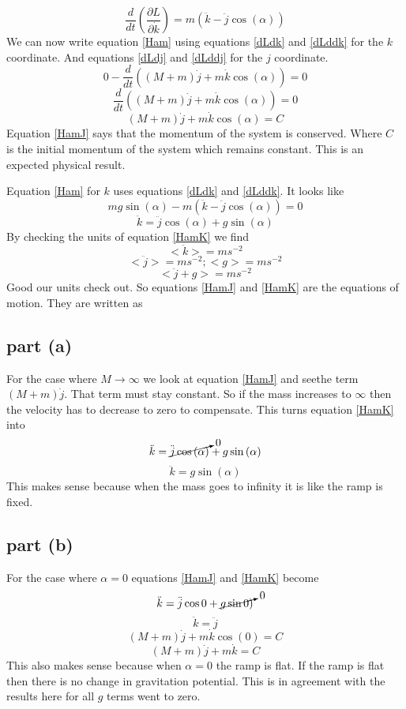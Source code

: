 \documentclass[11pt]{article}
\numberwithin{equation}{section}
\newcommand{\partdk}{\frac{\partial L}{\partial \dot{k}}}
\begin{document}
\begin{equation}
\frac{d}{dt}\left(\partdk\right) = m(\ddot{k} - \ddot{j}\cos{(\alpha)})
\label{dLddk}
\end{equation}
We can now write equation \ref{Ham} using equations \ref{dLdk} and \ref{dLddk} for the $k$ coordinate. And equations \ref{dLdj} and \ref{dLddj} for the $j$ coordinate.
$$0 - \frac{d}{dt}\left((M +m)\dot{j} +  m\dot{k}\cos{(\alpha)}\right) = 0$$
$$\frac{d}{dt}\left((M +m)\dot{j} +  m\dot{k}\cos{(\alpha)}\right) = 0$$
\begin{equation}
(M +m)\dot{j} +  m\dot{k}\cos{(\alpha)} = C
\label{HamJ}
\end{equation}
Equation \ref{HamJ} says that the momentum of the system is conserved. Where $C$ is the initial momentum of the system which remains constant. This is an expected physical result.

Equation \ref{Ham} for $k$ uses equations \ref{dLdk} and \ref{dLddk}. It looks like
$$mg\sin{(\alpha)} - m(\ddot{k} - \ddot{j}\cos{(\alpha)}) = 0$$
\begin{equation}
\ddot{k} = \ddot{j}\cos{(\alpha)} + g\sin{(\alpha)}
\label{HamK}
\end{equation}
By checking the units of equation \ref{HamK} we find
$$<\ddot{k}> = m s^{-2}$$
$$<\ddot{j}> = m s^{-2}; <g> = m s^{-2}$$
$$<\ddot{j} + g> = m s^{-2}$$
Good our units check out. So equations \ref{HamJ} and \ref{HamK} are the equations of motion. They are written as
\begin{center}
\end{center}

\subsection{part (a)}
For the case where $M \rightarrow \infty$ we look at equation \ref{HamJ} and seethe term $(M+m)\dot{j}$. That term must stay constant. So if the mass increases to $\infty$ then the velocity has to decrease to zero to compensate. This turns equation \ref{HamK} into
$$\ddot{k} = \cancelto{0}{\ddot{j}\cos{(\alpha)}} + g\sin{(\alpha)}$$
$$\ddot{k} = g\sin{(\alpha)}$$
This makes sense because when the mass goes to infinity it is like the ramp is fixed.

\subsection{part (b)}
For the case where $\alpha = 0$ equations \ref{HamJ} and \ref{HamK} become
$$\ddot{k} = \ddot{j}\cos{0} + \cancelto{0}{g\sin{0)}}$$
$$\ddot{k} = \ddot{j}$$
$$(M +m)\dot{j} +  m\dot{k}\cos{(0)} = C$$
$$(M +m)\dot{j} +  m\dot{k} = C$$
This also makes sense because when $\alpha = 0$ the ramp is flat. If the ramp is flat then there is no change in gravitation potential. This is in agreement with the results here for all $g$ terms went to zero.
\end{document}
